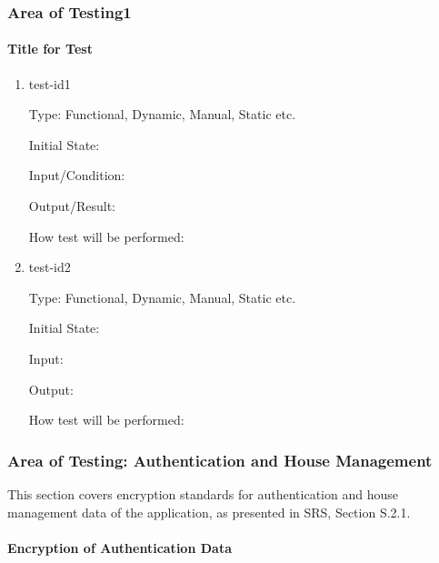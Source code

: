 \documentclass[12pt, titlepage]{article}
\begin{document}



\subsubsection{Area of Testing1}
		
\paragraph{Title for Test}

\begin{enumerate}

\item{test-id1\\}

Type: Functional, Dynamic, Manual, Static etc.
					
Initial State: 
					
Input/Condition: 
					
Output/Result: 
					
How test will be performed: 
					
\item{test-id2\\}

Type: Functional, Dynamic, Manual, Static etc.
					
Initial State: 
					
Input: 
					
Output: 
					
How test will be performed: 

\end{enumerate}

\subsubsection{Area of Testing: Authentication and House Management}
This section covers encryption standards for authentication and house management data of the application, as presented in SRS, Section S.2.1.

\paragraph{Encryption of Authentication Data}
\end{document}
